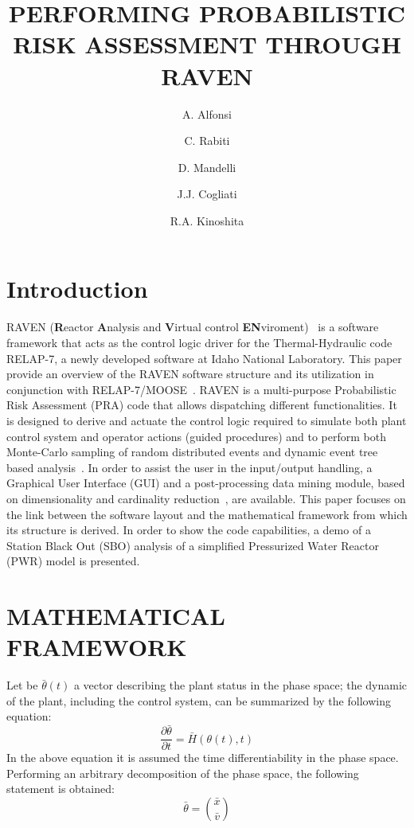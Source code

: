 \documentclass{anstrans}
\title{PERFORMING PROBABILISTIC RISK ASSESSMENT THROUGH RAVEN}
\author{A. Alfonsi \and  C. Rabiti \and D. Mandelli \and J.J. Cogliati \and R.A. Kinoshita}
\institute{
Idaho National Laboratory
}
\begin{document}
  \twocolumn[
    \begin{@twocolumnfalse}
        \maketitle
    \end{@twocolumnfalse}
  ]

\section{Introduction}
RAVEN (\textbf{R}eactor \textbf{A}nalysis and \textbf{V}irtual control \textbf{EN}viroment)~\cite{ravenFY12,mandelliANS2012} is a software framework that acts as the control logic driver for the Thermal-Hydraulic code RELAP-7, a newly developed software at Idaho National Laboratory. This paper provide an overview of the RAVEN software structure and its utilization in conjunction with RELAP-7/MOOSE~\cite{MOOSE,relap7FY12}. RAVEN is a multi-purpose Probabilistic Risk Assessment (PRA) code that allows dispatching different functionalities.
It is designed to derive and actuate the control logic required to simulate both plant control system and operator actions (guided procedures) and to perform both Monte-Carlo sampling of random distributed events and dynamic event tree based analysis~\cite{ADAPTHakobyan}.
In order to assist the user in the input/output handling, a Graphical User Interface (GUI) and a post-processing data mining module, based on dimensionality and cardinality reduction~\cite{mandelliEsrel2011}, are available.
This paper focuses on the link between the software layout and the mathematical framework from which its structure is derived. In order to show the code capabilities, a demo of a Station Black Out (SBO) analysis of a simplified Pressurized Water Reactor (PWR) model is presented.
\section{MATHEMATICAL FRAMEWORK}
\label{sec:mathFramework}
Let be $\bar{\theta}(t)$ a vector describing the plant status in the phase space; the dynamic of the plant, including the control system, can be summarized by the following equation:
\begin{equation}
\frac{\partial \bar{\theta}}{\partial t} = \bar{H}(\theta(t),t)
\label{eq:SystemDynamics}
\end{equation}
In the above equation it is assumed the time differentiability in the phase space. Performing an arbitrary decomposition of the phase space, the following statement is obtained:
\begin{equation}
\bar{\theta}=\binom{\bar{x}}{\bar{v}}
\label{eq:firstDecomposition}
\end{equation}
\end{document}
